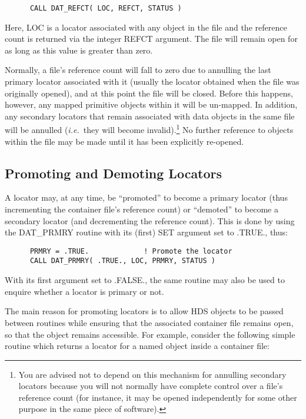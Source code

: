 \small
\begin{verbatim}
      CALL DAT_REFCT( LOC, REFCT, STATUS )
\end{verbatim}
\normalsize

Here, LOC is a locator associated with any object in the file and the reference
count is returned via the integer REFCT argument. The file will remain open for
as long as this value is greater than zero.

Normally, a file's reference count will fall to zero due to annulling the last
primary locator associated with it (usually the locator obtained when the file
was originally opened), and at this point the file will be closed. Before this
happens, however, any mapped primitive objects within it will be un-mapped. In
addition, any secondary locators that remain associated with data objects in the
same file will be annulled ({\em i.e.}\ they will become invalid).\footnote{You
are advised not to depend on this mechanism for annulling secondary locators
because you will not normally have complete control over a file's reference
count (for instance, it may be opened independently for some other purpose in
the same piece of software).} No further reference to objects within the file
may be made until it has been explicitly re-opened.

\subsection{Promoting and Demoting Locators}
\label{sect:promote}

A locator may, at any time, be ``promoted'' to become a primary locator (thus
incrementing the container file's reference count) or ``demoted'' to become a
secondary locator (and decrementing the reference count). This is done by using
the DAT\_PRMRY routine with its (first) SET argument set to .TRUE., thus:

\small
\begin{verbatim}
      PRMRY = .TRUE.             ! Promote the locator
      CALL DAT_PRMRY( .TRUE., LOC, PRMRY, STATUS )
\end{verbatim}
\normalsize

With its first argument set to .FALSE., the same routine may also be used to
enquire whether a locator is primary or not.

The main reason for promoting locators is to allow HDS objects to be passed
between routines while ensuring that the associated container file remains open,
so that the object remains accessible. For example, consider the following
simple routine which returns a locator for a named object inside a container
file:


